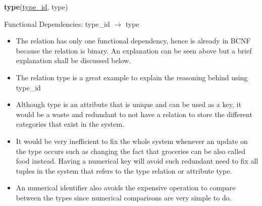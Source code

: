 \documentclass{article}
\begin{document}
\textbf{type}(\underline{type\_id}, type)

Functional Dependencies: type\_id $\to$ type

\begin{itemize}
    \item The relation has only one functional dependency, hence is already in BCNF because the relation is binary. An explanation can be seen above but a brief explanation shall be discussed below.
    \item The relation type is a great example to explain the reasoning behind using type\_id
    \item Although type is an attribute that is unique and can be used as a key, it would be a waste and redundant to not have a relation to store the different categories that exist in the system. 
    \item It would be very inefficient to fix the whole system whenever an update on the type occurs such as changing the fact that groceries can be also called food instead. Having a numerical key will avoid such redundant need to fix all tuples in the system that refers to the type relation or attribute type.
    \item An numerical identifier also avoids the expensive operation to compare between the types since numerical comparisons are very simple to do.
\end{itemize}
\end{document}
